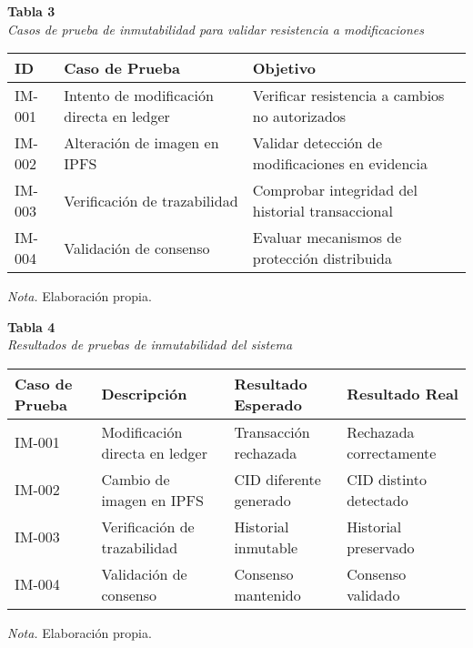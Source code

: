 \begin{table}[htbp]
    \begin{flushleft}
        \textbf{Tabla 3}\\
        \textit{Casos de prueba de inmutabilidad para validar resistencia a modificaciones}
    \end{flushleft}
    \centering
    \begin{tabular}{|p{2cm}|p{6cm}|p{4cm}|}
    \hline
    \textbf{ID} & \textbf{Caso de Prueba} & \textbf{Objetivo} \\
    \hline
    IM-001 & Intento de modificación directa en ledger & Verificar resistencia a cambios no autorizados \\
    \hline
    IM-002 & Alteración de imagen en IPFS & Validar detección de modificaciones en evidencia \\
    \hline
    IM-003 & Verificación de trazabilidad & Comprobar integridad del historial transaccional \\
    \hline
    IM-004 & Validación de consenso & Evaluar mecanismos de protección distribuida \\
    \hline
    \end{tabular}
    \vspace{0.5em}
    \begin{flushleft}
        \textit{Nota.} Elaboración propia.
    \end{flushleft}
    \label{tab:casos_prueba_inmutabilidad}
\end{table}

\begin{table}[htbp]
    \begin{flushleft}
        \textbf{Tabla 4}\\
        \textit{Resultados de pruebas de inmutabilidad del sistema}
    \end{flushleft}
    \centering
    \begin{tabular}{|p{3cm}|p{4cm}|p{3cm}|p{3cm}|}
    \hline
    \textbf{Caso de Prueba} & \textbf{Descripción} & \textbf{Resultado Esperado} & \textbf{Resultado Real} \\
    \hline
    IM-001 & Modificación directa en ledger & Transacción rechazada & Rechazada correctamente \\
    \hline
    IM-002 & Cambio de imagen en IPFS & CID diferente generado & CID distinto detectado \\
    \hline
    IM-003 & Verificación de trazabilidad & Historial inmutable & Historial preservado \\
    \hline
    IM-004 & Validación de consenso & Consenso mantenido & Consenso validado \\
    \hline
    \end{tabular}
    \vspace{0.5em}
    \begin{flushleft}
        \textit{Nota.} Elaboración propia.
    \end{flushleft}
    \label{tab:resultados_inmutabilidad}
\end{table} 